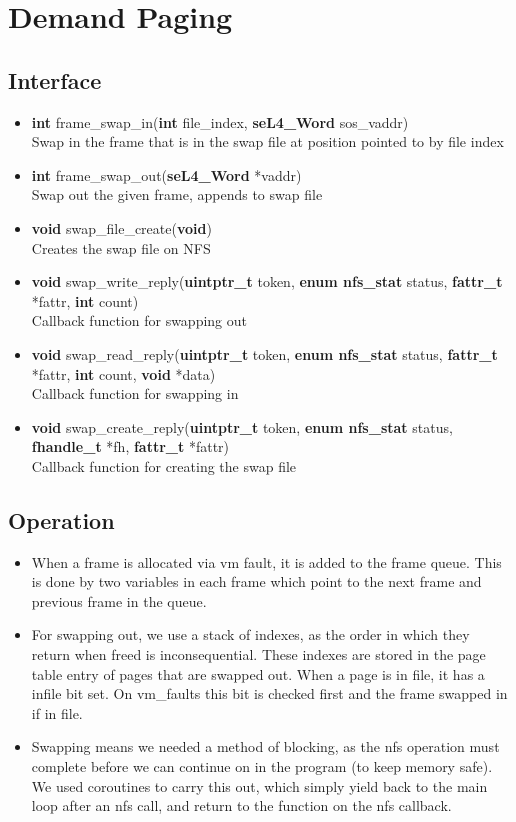 \documentclass[12pt]{article}
\begin{document}
\clearpage
\section{Demand Paging}
\subsection{Interface}
\begin{itemize}
\item \textbf{int} frame\_swap\_in(\textbf{int} file\_index, \textbf{seL4\_Word} sos\_vaddr)\\
Swap in the frame that is in the swap file at position pointed to by file index
\item \textbf{int} frame\_swap\_out(\textbf{seL4\_Word} *vaddr)\\
Swap out the given frame, appends to swap file
\item \textbf{void} swap\_file\_create(\textbf{void})\\
Creates the swap file on NFS
\item \textbf{void} swap\_write\_reply(\textbf{uintptr\_t} token, \textbf{enum nfs\_stat} status, \textbf{fattr\_t} *fattr, \textbf{int} count)\\
Callback function for swapping out
\item \textbf{void} swap\_read\_reply(\textbf{uintptr\_t} token, \textbf{enum nfs\_stat} status, \textbf{fattr\_t} *fattr, \textbf{int} count, \textbf{void} *data)\\
Callback function for swapping in
\item \textbf{void} swap\_create\_reply(\textbf{uintptr\_t} token, \textbf{enum nfs\_stat} status, \textbf{fhandle\_t} *fh, \textbf{fattr\_t} *fattr)\\
Callback function for creating the swap file
\end{itemize}
\subsection{Operation}
\begin{itemize}
\item When a frame is allocated via vm fault, it is added to the frame queue. This is
done by two variables in each frame which point to the next frame and previous
frame in the queue.

\item For swapping out, we use a stack of indexes, as the order in which they return
when freed is inconsequential. These indexes are stored in the page table entry
of pages that are swapped out. When a page is in file, it has a infile bit set. On vm\_faults this bit is checked first and the frame swapped in if in file.

\item Swapping means we needed a method of blocking, as the nfs operation must complete before we can continue on in the program (to keep memory safe).
We used coroutines to carry this out, which simply yield back to the main loop after an nfs call, and return to the function on the nfs callback.
\end{itemize}
\end{document}
